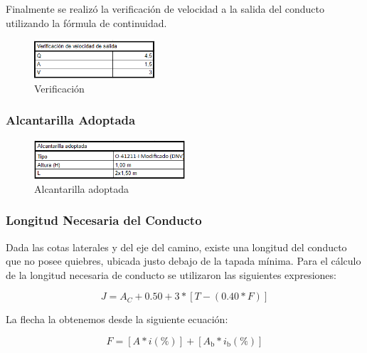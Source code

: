 \documentclass[../main.tex]{subfiles}
\begin{document}
Finalmente se realizó la verificación de velocidad a la salida del conducto utilizando la fórmula de continuidad.

\begin{figure}[h]
    \centering
    \includegraphics[width=0.4\textwidth]{images/google_sheets/Screenshot_20.png}
    \caption{Verificación}
    \label{fig:verificacion}
\end{figure}

\subsubsection{Alcantarilla Adoptada}


\begin{figure}[h]
    \centering
    \includegraphics[width=0.5\textwidth]{images/google_sheets/Screenshot_21.png}
    \caption{Alcantarilla adoptada}
    \label{fig:alcantarilla_adoptada}
\end{figure}

\subsubsection{Longitud Necesaria del Conducto}

Dada las cotas laterales y del eje del camino, existe una longitud del conducto que no posee quiebres, ubicada justo debajo de la tapada mínima.
Para el cálculo de la longitud necesaria de conducto se utilizaron las siguientes expresiones: 

\begin{equation}
J = A_C + 0.50+3*[T - (0.40 * F)]
\end{equation}

La flecha la obtenemos desde la siguiente ecuación:

\begin{equation}
F = [A*i(\%)] + [A_{\text{b}}*i_{\text{b}}(\%)]  
\end{equation}
\end{document}
